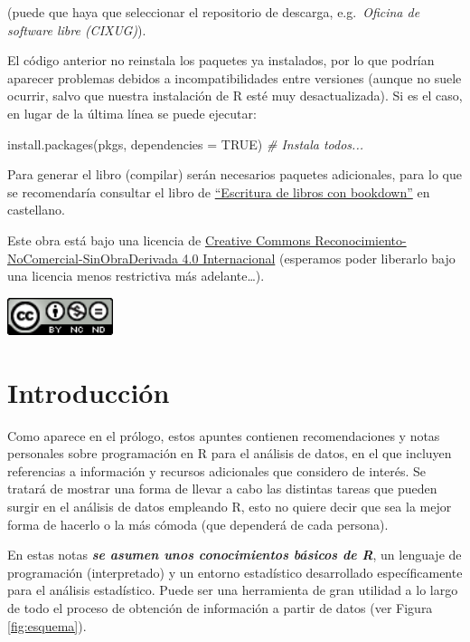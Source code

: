 \documentclass[
]{book}
\newenvironment{Shaded}{\begin{snugshade}}{\end{snugshade}}
\newcommand{\AttributeTok}[1]{\textcolor[rgb]{0.77,0.63,0.00}{#1}}
\newcommand{\CommentTok}[1]{\textcolor[rgb]{0.56,0.35,0.01}{\textit{#1}}}
\newcommand{\ConstantTok}[1]{\textcolor[rgb]{0.00,0.00,0.00}{#1}}
\newcommand{\FunctionTok}[1]{\textcolor[rgb]{0.00,0.00,0.00}{#1}}
\newcommand{\NormalTok}[1]{#1}
\theoremstyle{break}
\theoremstyle{nonumberplain}
\begin{document}
(puede que haya que seleccionar el repositorio de descarga, e.g.~\emph{Oficina de software libre (CIXUG)}).

El código anterior no reinstala los paquetes ya instalados, por lo que podrían aparecer problemas debidos a incompatibilidades entre versiones (aunque no suele ocurrir, salvo que nuestra instalación de R esté muy desactualizada).
Si es el caso, en lugar de la última línea se puede ejecutar:

\begin{Shaded}
\begin{Highlighting}[]
\FunctionTok{install.packages}\NormalTok{(pkgs, }\AttributeTok{dependencies =} \ConstantTok{TRUE}\NormalTok{) }\CommentTok{\# Instala todos...}
\end{Highlighting}
\end{Shaded}

Para generar el libro (compilar) serán necesarios paquetes adicionales,
para lo que se recomendaría consultar el libro de \href{https://rubenfcasal.github.io/bookdown_intro}{``Escritura de libros con bookdown''} en castellano.

Este obra está bajo una licencia de \href{https://creativecommons.org/licenses/by-nc-nd/4.0/deed.es_ES}{Creative Commons Reconocimiento-NoComercial-SinObraDerivada 4.0 Internacional}
(esperamos poder liberarlo bajo una licencia menos restrictiva más adelante\ldots).

\includegraphics[width=1.22in]{by-nc-nd-88x31}

\hypertarget{intro}{%
\chapter{Introducción}\label{intro}}

Como aparece en el prólogo, estos apuntes contienen recomendaciones y notas personales sobre programación en R para el análisis de datos, en el que incluyen referencias a información y recursos adicionales que considero de interés.
Se tratará de mostrar una forma de llevar a cabo las distintas tareas que pueden surgir en el análisis de datos empleando R, esto no quiere decir que sea la mejor forma de hacerlo o la más cómoda (que dependerá de cada persona).

En estas notas \textbf{\emph{se asumen unos conocimientos básicos de R}}, un lenguaje de programación (interpretado) y un entorno estadístico desarrollado específicamente para el análisis estadístico.
Puede ser una herramienta de gran utilidad a lo largo de todo el proceso de obtención de información a partir de datos (ver Figura \ref{fig:esquema}).
\end{document}
